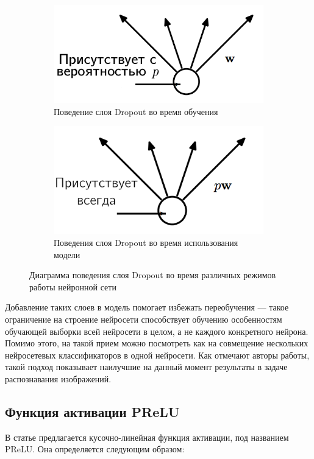 \documentclass[14pt, a4paper]{extarticle}
\begin{document}
\begin{figure}
\begin{subfigure}{.5\textwidth}
	\centering
	\includegraphics[scale=.85]{images/dropout1.png}
	\caption{Поведение слоя Dropout во время обучения}
\end{subfigure}
\begin{subfigure}{.5\textwidth}
	\centering
	\includegraphics[scale=.9]{images/dropout2.png}
	\caption{Поведения слоя Dropout во время использования модели}
\end{subfigure}
\caption{Диаграмма поведения слоя Dropout во время различных режимов работы нейронной сети}
\label{figure:dropout}
\end{figure}

Добавление таких слоев в модель помогает избежать переобучения — такое ограничение на строение нейросети способствует обучению особенностям обучающей выборки всей нейросети в целом, а не каждого конкретного нейрона. Помимо этого, на такой прием можно посмотреть как на совмещение нескольких нейросетевых классификаторов в одной нейросети. Как отмечают авторы работы, такой подход показывает наилучшие на данный момент результаты в задаче распознавания изображений.

\subsection*{Функция активации PReLU}
В статье \cite{prelu} предлагается кусочно-линейная функция активации, под названием PReLU. Она определяется следующим образом:
\end{document}
